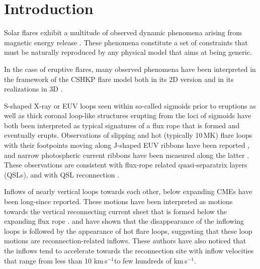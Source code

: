 \documentclass[apj]{emulateapj}
\newcommand{\kps}{km\,s$^{-1}$}
\begin{document}
%

\section{Introduction}
\label{Sect:1}

Solar flares exhibit a multitude of observed dynamic phenomena arising from magnetic energy release \citep[e.g.,][]{Fle2011,Sch2015}. These phenomena constitute a set of constraints that must be naturally reproduced by any physical model that aims at being generic. 
 
In the case of eruptive flares, many observed phenomena have been interpreted in the framework of the CSHKP flare model \citep{Carmichael64,Sturrock66,Hirayama74,Kopp76}  both in its  2D version and in its  realizations in 3D \citep{Shi1995,Moore2001,Aul2012,Janvier13,Janvier15}. %

S-shaped X-ray or EUV loops seen within so-called sigmoids prior to eruptions \citep[e.g. ][]{Green09,Savcheva12a,Savcheva12b,Savcheva14,Zhao2016} as well as thick coronal loop-like structures erupting from the loci of sigmoids \citep[e.g. ][]{Cheng10,Zhang12,Patsourakos13,Cheng13,Dudik14a,Cheng14a,Cheng14b,Cheng15} have both been interpreted as typical signatures of a flux rope that is formed and eventually erupts. Observations of slipping and hot (typically 10\,MK) flare loops with their footpoints moving along J-shaped EUV ribbons have been reported \citep{Dudik14a,Dudik16,Li14,Li15,Gou16}, and narrow photospheric current ribbons have been measured along the latter \citep{Aul2012,Janvier14,Janvier16}. These observations are consistent with flux-rope related quasi-separatrix layers (QSLs), and with QSL reconnection \citep{Sav2015,Sav2016}. 

Inflows of nearly vertical loops towards each other,  below expanding CMEs have been long-since reported. These motions have been interpreted as motions towards the vertical reconnecting current sheet that is formed below the expanding flux rope \citep[e.g. ][]{Yokoyama01,Liu10b,Savage12,Takasao12,Hannah13,Zhu16}.  \cite{Su13} and \cite{Zhu16} have shown that the disappearance of the inflowing loops is followed by the appearance of hot flare loops, suggesting that these loop motions are reconnection-related inflows. These authors have also noticed that the inflows tend to accelerate towards the reconnection site with inflow velocities that range from less than 10 \kps to few hundreds of \kps \citep{Liu10b,Savage12,Su13,Zhu16}.
\end{document}
